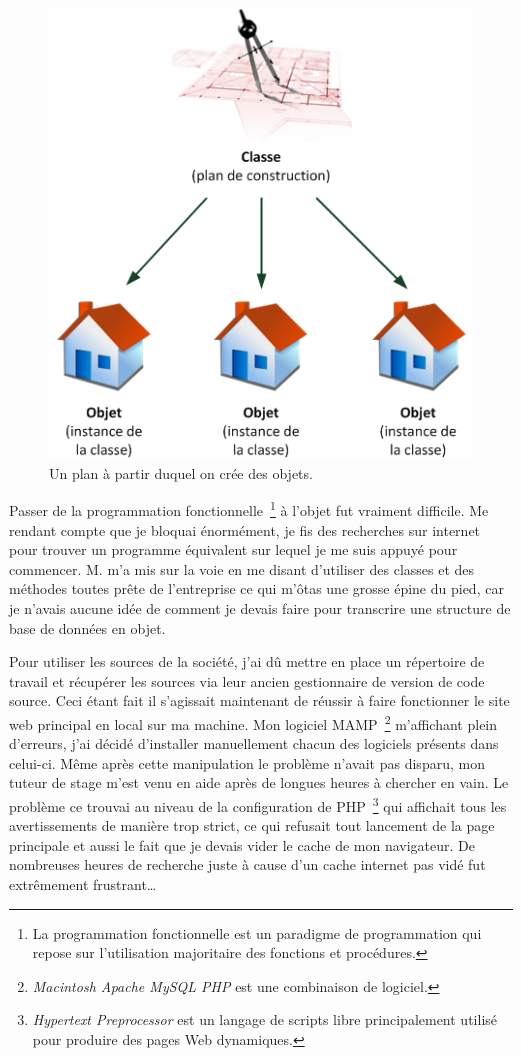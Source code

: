 \begin{figure}
\begin{center}
\includegraphics[scale=0.5]{images/objet.png}
\end{center}
\caption{Un plan à partir duquel on crée des objets.}
\end{figure}

Passer de la programmation fonctionnelle\, \footnote{La programmation
fonctionnelle est un paradigme de programmation qui repose sur l'utilisation
majoritaire des fonctions et procédures.} à l'objet fut vraiment difficile. Me
rendant compte que je bloquai énormément, je fis des recherches sur internet
pour trouver un programme équivalent sur lequel je me suis appuyé pour
commencer. M. m'a mis sur la voie en me disant d'utiliser des
classes et des méthodes toutes prête de l'entreprise ce qui m'ôtas une grosse
épine du pied, car je n'avais aucune idée de comment je devais faire pour
transcrire une structure de base de données en objet.

Pour utiliser les sources de la société, j'ai dû mettre en place un répertoire
de travail et récupérer les sources via leur ancien gestionnaire de version de
code source. Ceci étant fait il s'agissait maintenant de réussir à faire
fonctionner le site web principal en local sur ma machine. Mon logiciel MAMP\,
\footnote{\emph{Macintosh Apache MySQL PHP} est une combinaison de logiciel.}
m'affichant plein d'erreurs, j'ai décidé d'installer manuellement chacun des
logiciels présents dans celui-ci. Même après cette manipulation le problème
n'avait pas disparu, mon tuteur de stage m'est venu en aide après de longues
heures à chercher en vain. Le problème ce trouvai au niveau de la configuration
de PHP\, \footnote{\emph{Hypertext Preprocessor} est un langage de scripts
libre principalement utilisé pour produire des pages Web dynamiques.} qui
affichait tous les avertissements de manière trop strict, ce qui refusait tout
lancement de la page principale et aussi le fait que je devais vider le cache
de mon navigateur. De nombreuses heures de recherche juste à cause d'un cache
internet pas vidé fut extrêmement frustrant\ldots{}

